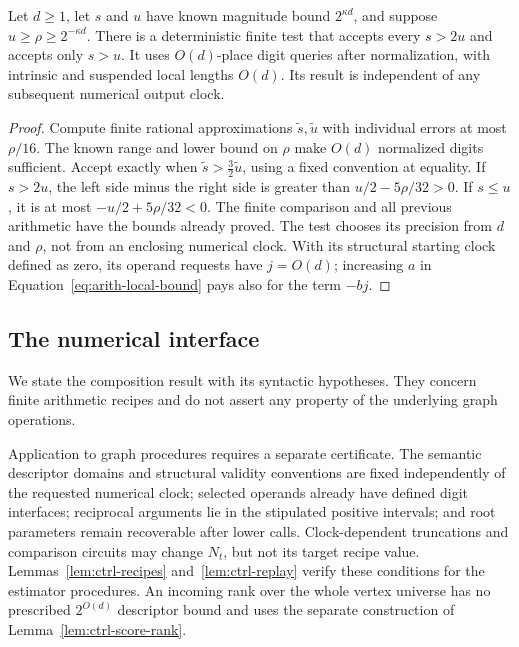 \begin{lemma}
\label{lem:arith-buffered-test}
Let $d\geq1$, let $s$ and $u$ have known magnitude bound $2^{\kappa d}$,
and suppose $u\geq\rho\geq2^{-\kappa d}$.  There is a deterministic
finite test that accepts every $s>2u$ and accepts only $s>u$.
It uses $O(d)$-place digit queries after normalization, with
intrinsic and suspended local lengths $O(d)$.  Its result is
independent of any subsequent numerical output clock.
\end{lemma}

\begin{proof}
Compute finite rational approximations $\widetilde s,\widetilde u$
with individual errors at most $\rho/16$.  The known range and
lower bound on $\rho$ make $O(d)$ normalized digits sufficient.
Accept exactly when
$\widetilde s>\tfrac32\widetilde u$, using a fixed convention
at equality.  If $s>2u$, the left side minus the right side is
greater than $u/2-5\rho/32>0$.  If $s\leq u$, it is at most
$-u/2+5\rho/32<0$.  The finite comparison and all previous
arithmetic have the bounds already proved.  The test chooses its
precision from $d$ and $\rho$, not from an enclosing numerical
clock.  With its structural starting clock defined as zero, its
operand requests have $j=O(d)$; increasing $a$ in
Equation~\eqref{eq:arith-local-bound} pays also for the term $-bj$.
\end{proof}

\subsection{The numerical interface}

We state the composition result with its syntactic hypotheses.
They concern finite arithmetic recipes and do not assert any
property of the underlying graph operations.

Application to graph procedures requires a separate certificate.  The
semantic descriptor domains and structural validity conventions are
fixed independently of the requested numerical clock; selected operands
already have defined digit interfaces; reciprocal arguments lie in the
stipulated positive intervals; and root parameters remain recoverable
after lower calls.  Clock-dependent truncations and comparison circuits
may change $N_t$, but not its target recipe value.
Lemmas~\ref{lem:ctrl-recipes} and~\ref{lem:ctrl-replay} verify these
conditions for the estimator procedures.  An incoming rank over the
whole vertex universe has no prescribed $2^{O(d)}$ descriptor bound and
uses the separate construction of Lemma~\ref{lem:ctrl-score-rank}.

